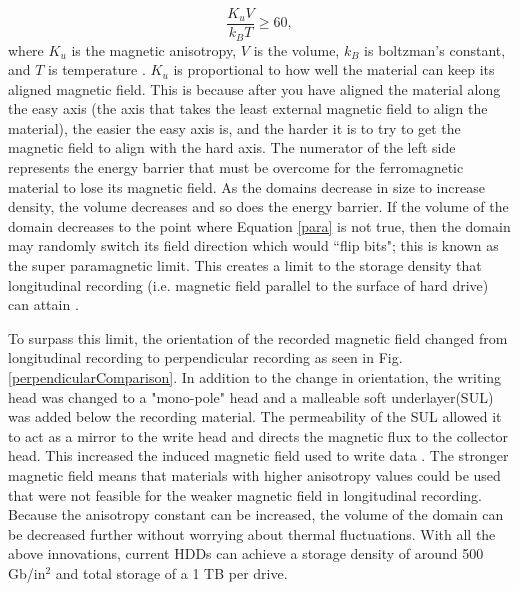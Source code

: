 \documentclass[ notitlepage, numerical, 11pt]{revtex4-1} %
\begin{document}
\begin{equation}
\frac{K_uV}{k_BT} \geq 60,
\label{para}
\end{equation}
where $K_u$ is the magnetic anisotropy, $V$ is the volume, $k_B$ is boltzman's constant, and $T$ is temperature \cite{memory}. $K_u$ is proportional to how well the material can keep its aligned magnetic field. This is because after you have aligned the material along the easy axis (the axis that takes the least external magnetic field to align the material), the easier the easy axis is, and the harder it is to try to get the magnetic field to align with the hard axis. The numerator of the left side represents the energy barrier that must be overcome for the ferromagnetic material to lose its magnetic field. As the domains decrease in size to increase density, the volume decreases and so does the energy barrier. If the volume of the domain decreases to the point where Equation \ref{para} is not true, then the domain may randomly switch its field direction which would ``flip bits"; this is known as the super paramagnetic limit. This creates a limit to the storage density that longitudinal recording (i.e. magnetic field parallel to the surface of hard drive) can attain \cite{perpendicular}.

To surpass this limit, the orientation of the recorded magnetic field changed from longitudinal recording to perpendicular recording as seen in Fig. \ref{perpendicularComparison}. In addition to the change in orientation, the writing head was changed to a "mono-pole" head and a malleable soft underlayer(SUL) was added below the recording material. The permeability of the SUL allowed it to act as a mirror to the write head and directs the magnetic flux to the collector head. This increased the induced magnetic field used to write data \cite{highDensity}. The stronger magnetic field means that materials with higher anisotropy values could be used that were not feasible for the weaker magnetic field in longitudinal recording. Because the anisotropy constant can be increased, the volume of the domain can be decreased further without worrying about thermal fluctuations. With all the above innovations, current HDDs can achieve a storage density of around 500 Gb/in$^2$ and total storage of a 1 TB per drive.
\end{document}
